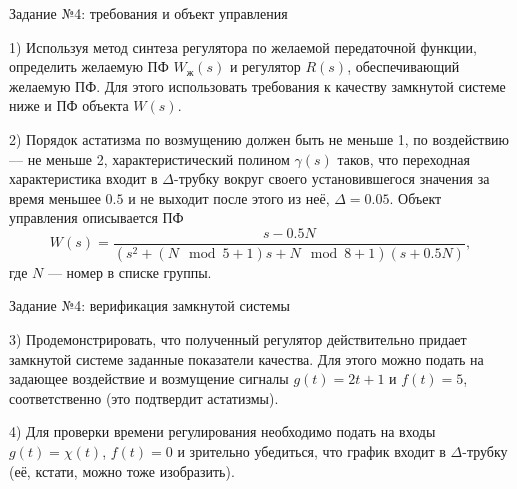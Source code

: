 \documentclass{beamer}
\theoremstyle{plain}
\theoremstyle{definition}
\theoremstyle{remark}
\theoremstyle{plain}
\begin{document}
\begin{frame}{Задание №4: требования и объект управления}

1) Используя метод синтеза регулятора по желаемой передаточной функции, определить желаемую ПФ $W_{\text{ж}}(s)$ и регулятор $R(s)$, обеспечивающий
желаемую ПФ. Для этого использовать требования к качеству замкнутой системе ниже и ПФ объекта $W(s)$.

\vspace{0.5cm}

2) Порядок астатизма по возмущению должен быть не меньше 1, по воздействию --- не меньше 2, характеристический полином $\gamma(s)$ таков, что
переходная характеристика входит в $\Delta$-трубку вокруг своего установившегося значения за время меньшее $0.5$ и не выходит после этого из неё, $\Delta=0.05$.
Объект управления описывается ПФ
$$
W(s)= \frac{s-0.5N}{(s^2+(N\mod 5 +1)s+ N\mod 8 +1)(s+0.5N)},
$$
где $N$ --- номер в списке группы.
\end{frame}


\begin{frame}{Задание №4: верификация замкнутой системы}

3) Продемонстрировать, что полученный регулятор действительно придает замкнутой системе заданные показатели качества. Для этого можно
подать на задающее воздействие и возмущение сигналы $g(t) = 2t+1$ и $f(t) = 5$, соответственно (это подтвердит астатизмы).

\vspace{0.5cm}

4) Для проверки времени регулирования необходимо подать на входы $g(t) = \chi(t)$, $f(t) = 0$ и зрительно убедиться, что график входит в $\Delta$-трубку (её, кстати, можно тоже изобразить).

\end{frame}
\end{document}
